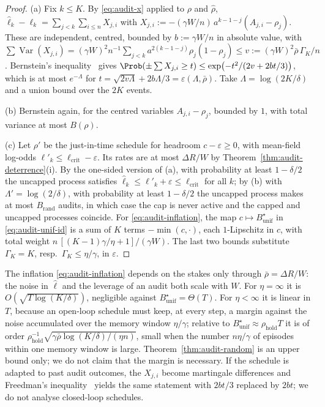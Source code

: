 \begin{proof}
(a) Fix $k\le K$. By \eqref{eq:audit-x} applied to $\rho$ and $\hat\rho$,
$\hat\ell_k-\ell_k=\sum_{j<k}\sum_{i\le n}X_{j,i}$ with
$X_{j,i}:=-(\gamma W/n)\,a^{k-1-j}(A_{j,i}-\rho_j)$. These are independent,
centred, bounded by $b:=\gamma W/n$ in absolute value, with
$\sum\operatorname{Var}(X_{j,i})=(\gamma W)^2n^{-1}\sum_{j<k}a^{2(k-1-j)}\rho_j(1-\rho_j)
\le v:=(\gamma W)^2\bar\rho\,\Gamma_K/n$. Bernstein's
inequality~\cite{boucheron2013concentration} gives
$\Prob(\pm\sum X_{j,i}\ge t)\le\exp\bigl(-t^2/(2v+2bt/3)\bigr)$, which is at most
$e^{-\Lambda}$ for $t=\sqrt{2v\Lambda}+2b\Lambda/3=\varepsilon(\Lambda,\bar\rho)$.
Take $\Lambda=\log(2K/\delta)$ and a union bound over the $2K$ events.

(b) Bernstein again, for the centred variables $A_{j,i}-\rho_j$, bounded by $1$,
with total variance at most $B(\rho)$.

(c) Let $\rho'$ be the just-in-time schedule for headroom $c-\varepsilon\ge0$,
with mean-field log-odds $\ell'_k\le\ell_{\mathrm{crit}}-\varepsilon$. Its rates
are at most $\Delta R/W$ by Theorem~\ref{thm:audit-deterrence}(i). By the
one-sided version of (a), with probability at least $1-\delta/2$ the uncapped
process satisfies $\hat\ell_k\le\ell'_k+\varepsilon\le\ell_{\mathrm{crit}}$ for
all $k$; by (b) with $\Lambda'=\log(2/\delta)$, with probability at least
$1-\delta/2$ the uncapped process makes at most $B_{\mathrm{rand}}$ audits, in
which case the cap is never active and the capped and uncapped processes
coincide. For \eqref{eq:audit-inflation}, the map
$c\mapsto B^\star_{\mathrm{unif}}$ in \eqref{eq:audit-unif-id} is a sum of
$K$ terms $-\min(c,\cdot)$, each $1$-Lipschitz in $c$, with total weight
$n\,[(K-1)\gamma/\eta+1]/(\gamma W)$. The last two bounds substitute
$\Gamma_K=K$, resp.\ $\Gamma_K\le\eta/\gamma$, in $\varepsilon$.
\end{proof}

\begin{remark}\label{rem:audit-random}
The inflation \eqref{eq:audit-inflation} depends on the stakes only through
$\bar\rho=\Delta R/W$: the noise in $\hat\ell$ and the leverage of an audit both
scale with $W$. For $\eta=\infty$ it is $O(\sqrt{T\log(K/\delta)})$, negligible
against $B^\star_{\mathrm{unif}}=\Theta(T)$. For $\eta<\infty$ it is linear in
$T$, because an open-loop schedule must keep, at every step, a margin against
the noise accumulated over the memory window $\eta/\gamma$; relative to
$B^\star_{\mathrm{unif}}\approx\rho_{\mathrm{hold}}T$ it is of order
$\rho_{\mathrm{hold}}^{-1}\sqrt{\gamma\bar\rho\log(K/\delta)/(\eta n)}$, small
when the number $n\eta/\gamma$ of episodes within one memory window is large.
Theorem~\ref{thm:audit-random} is an upper bound only; we do not claim that the
margin is necessary. If the schedule is adapted to past audit outcomes, the
$X_{j,i}$ become martingale differences and Freedman's
inequality~\cite{freedman1975tail} yields the same statement with $2bt/3$
replaced by $2bt$; we do not analyse closed-loop schedules.
\end{remark}

